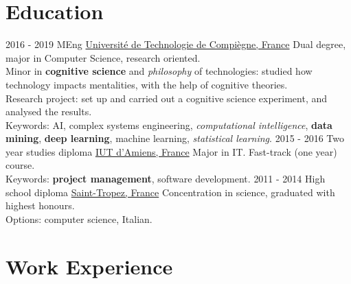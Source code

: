 \documentclass[a4paper]{twentysecondcv} %
\begin{document}
\makeprofile %


\section{Education}

\begin{twenty} %
	\twentyitem
    	{2016 - 2019}
        {}
        {MEng}
        {\href{https://www.utc.fr/}{Université de Technologie de Compiègne, France}}
        {}
        {Dual degree, major in Computer Science, research oriented.\\Minor in \textbf{cognitive science} and \textit{philosophy} of technologies: studied how technology impacts mentalities, with the help of cognitive theories.\\Research project: set up and carried out a cognitive science experiment, and analysed the results.\\Keywords: AI, complex systems engineering, \textit{computational intelligence}, \textbf{data mining}, \textbf{deep learning}, machine learning, \textit{statistical learning}.}
	\twentyitem
    	{2015 - 2016}
        {}
        {Two year studies diploma}
        {\href{http://www.iut-amiens.fr/}{IUT d'Amiens, France}}
        {}
        {Major in IT. Fast-track (one year) course.\\Keywords: \textbf{project management}, software development.}
	\twentyitem
    	{2011 - 2014}
		{}
        {High school diploma}
        {\href{http://www.lyc-du-golfe-de-saint-tropez.ac-nice.fr/}{Saint-Tropez, France}}
        {}
        {Concentration in science, graduated with highest honours.\\Options: computer science, Italian.}
\end{twenty}


\section{Work Experience}
\end{document}
